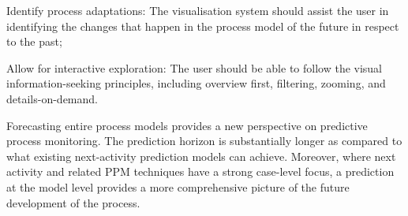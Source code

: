 \begin{requidescr}
	\item[Identify process adaptations:\namedlabel{req:adaptation}] The visualisation system should assist the user in identifying the changes that happen in the process model of the future in respect to the past;
	\item[Allow for interactive exploration:\namedlabel{req:interactive}] The user should be able to follow the visual information-seeking principles, including overview first, filtering, zooming, and details-on-demand.
\end{requidescr} %

Forecasting entire process models provides a new perspective on predictive process monitoring. 
The prediction horizon is substantially longer as compared to what existing next-activity prediction models can achieve. Moreover, where next activity and related PPM techniques have a strong case-level focus, a prediction at the model level provides a more comprehensive picture of the future development of the process.


